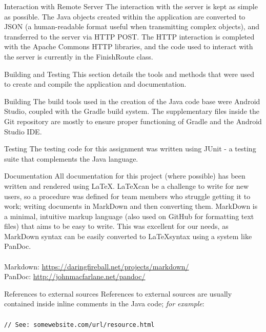 \documentclass{article}
\begin{document}
	\begin{section}{Interaction with Remote Server}
		The interaction with the server is kept as simple as possible. The Java objects created within the application are converted to JSON (a human-readable format useful when transmitting complex objects), and transferred to the server via HTTP POST. The HTTP interaction is completed with the Apache Commons HTTP libraries, and the code used to interact with the server is currently in the FinishRoute class.
	\end{section}
	
	\newpage
	\begin{section}{Building and Testing}
		This section details the tools and methods that were used to create and compile the application and documentation.
		
		\begin{subsection}{Building}
			The build tools used in the creation of the Java code base were Android Studio, coupled with the Gradle build system. The supplementary files inside the Git repository are mostly to ensure proper functioning of Gradle and the Android Studio IDE.
		\end{subsection}
		
		\begin{subsection}{Testing}
			The testing code for this assignment was written using JUnit - a testing suite that complements the Java language.
		\end{subsection}
		
		\begin{subsection}{Documentation}
			All documentation for this project (where possible) has been written and rendered using \LaTeX. \LaTeX can be a challenge to write for new users, so a procedure was defined for team members who struggle getting it to work; writing documents in MarkDown and then converting them. MarkDown is a minimal, intuitive markup language (also used on GitHub for formatting text files) that aims to be easy to write. This was excellent for our needs, as MarkDown syntax can be easily converted to \LaTeX syntax using a system like PanDoc. \\ \\
			Markdown: \url{https://daringfireball.net/projects/markdown/} \\
			PanDoc: \url{http://johnmacfarlane.net/pandoc/}
		\end{subsection}
		
		\begin{subsection}{References to external sources}
			References to external sources are usually contained inside inline comments in the Java code; {\em for example}: \\ \\
			{\tt // See: somewebsite.com/url/resource.html}
		\end{subsection}
	\end{section}
	
\end{document}
